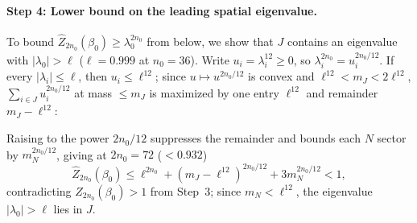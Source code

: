 \paragraph{Step 4: Lower bound on the leading spatial eigenvalue.}
To bound $\widehat Z_{2n_0}(\beta_0)\ge\lambda_0^{2n_0}$ from below, we
show that $J$ contains an eigenvalue with $|\lambda_0|>\ell$
($\ell=0.999$ at $n_0=36$). Write $u_i=\lambda_i^{12}\ge0$, so
$\lambda_i^{2n_0}=u_i^{2n_0/12}$. If every $|\lambda_i|\le\ell$, then
$u_i\le\ell^{12}$; since $u\mapsto u^{2n_0/12}$ is convex and
$\ell^{12}<m_J<2\ell^{12}$, $\sum_{i\in J}u_i^{2n_0/12}$ at mass
$\le m_J$ is maximized by one entry $\ell^{12}$ and remainder
$m_J-\ell^{12}$:
\begin{proofdiagram}
    \seedweightbars
\end{proofdiagram}
Raising to the power $2n_0/12$ suppresses the remainder and bounds
each $N$ sector by $m_N^{2n_0/12}$, giving at $2n_0=72$ ($<0.932$)
\begin{equation*}
    \widehat Z_{2n_0}(\beta_0)
    \le\ell^{2n_0}+(m_J-\ell^{12})^{2n_0/12}+3m_N^{2n_0/12}<1,
\end{equation*}
contradicting $\widehat Z_{2n_0}(\beta_0)>1$ from Step~3; since
$m_N<\ell^{12}$, the eigenvalue $|\lambda_0|>\ell$ lies in $J$.

